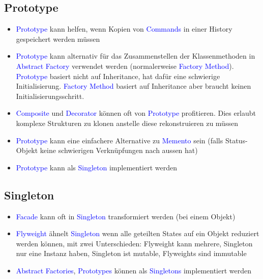 \subsection{Prototype}

\begin{itemize}
    \item \textcolor{blue}{Prototype} kann helfen, wenn Kopien von \textcolor{blue}{Commands} in einer History gespeichert werden müssen
    \item \textcolor{blue}{Prototype} kann alternativ für das Zusammenstellen der Klassenmethoden in \textcolor{blue}{Abstract Factory} verwendet werden (normalerweise \textcolor{blue}{Factory Method}). \textcolor{blue}{Prototype} basiert nicht auf Inheritance, hat dafür eine schwierige Initialisierung. \textcolor{blue}{Factory Method} basiert auf Inheritance aber braucht keinen Initialisierungsschritt.
    \item \textcolor{blue}{Composite} und \textcolor{blue}{Decorator} können oft von \textcolor{blue}{Prototype} profitieren. Dies erlaubt komplexe Strukturen zu klonen anstelle diese rekonstruieren zu müssen
    \item \textcolor{blue}{Prototype} kann eine einfachere Alternative zu \textcolor{blue}{Memento} sein (falls Status-Objekt keine schwierigen Verknüpfungen nach aussen hat)
    \item \textcolor{blue}{Prototype} kann als \textcolor{blue}{Singleton} implementiert werden
\end{itemize}

\subsection{Singleton}

\begin{itemize}
    \item \textcolor{blue}{Facade} kann oft in \textcolor{blue}{Singleton} transformiert werden (bei einem Objekt)
    \item \textcolor{blue}{Flyweight} ähnelt \textcolor{blue}{Singleton} wenn alle geteilten States auf ein Objekt reduziert werden können, mit zwei Unterschieden: Flyweight kann mehrere, Singleton nur eine Instanz haben, Singleton ist mutable, Flyweights sind immutable
    \item \textcolor{blue}{Abstract Factories}, \textcolor{blue}{Prototypes} können als \textcolor{blue}{Singletons} implementiert werden
\end{itemize}

